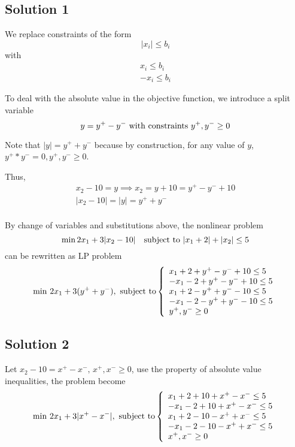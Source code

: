 \documentclass{article}
\begin{document}
\subsection{Solution 1}
We replace constraints of the form
\begin{equation} |x_i| \leq b_i \end{equation}
with
\begin{equation}
\begin{split}
	x_i \leq b_i \\
	-x_i \leq b_i
\end{split}
\end{equation}

To deal with the absolute value in the objective function, we introduce a split variable
\[ y = y^+ - y^- \textnormal{~with constraints~} y^+, y^- \geq 0 \]

Note that $|y| = y^+ + y^-$ because by construction, for any value of $y$, $y^+ * y^- = 0,   y^+, y^- \geq 0$.

Thus,
\begin{gather}
x_2 - 10 = y \implies x_2 = y + 10 = y^+ - y^- + 10 \\
|x_2 - 10| = |y| = y^+ + y^- \\
\end{gather}

By change of variables and substitutions above, the nonlinear problem
\[ \min 2 x_1 + 3|x_2 - 10| \quad \textnormal{subject to~} |x_1 + 2| + |x_2| \leq 5 \]
can be rewritten as LP problem
\begin{equation}
\min \, 2x_1+3(y^+ + y^-), \textnormal{ subject to}
\left\{
    \begin{array}{l}
    x_1 + 2 + y^+ - y^- + 10 \leq 5 \\
    -x_1 - 2 + y^+ - y^- + 10 \leq 5 \\
    x_1 + 2 - y^+ + y^- - 10 \leq 5 \\
    -x_1 - 2 - y^+ + y^- - 10 \leq 5 \\
     y^+, y^- \geq 0
    \end{array}
\right.
\end{equation}

\subsection{Solution 2}
Let $x_2-10=x^+-x^-,\, x^+,x^-\geq 0$, use the property of absolute value inequalities, the problem become
\begin{equation}  
\min \, 2x_1+3|x^+-x^-|, \textnormal{ subject to}
\left\{  
             \begin{array}{ll}
             x_1+2+10+x^+-x^-\leq 5\\
             -x_1-2+10+x^+-x^-\leq 5\\
             x_1+2-10-x^++x^-\leq 5\\
             -x_1-2-10-x^++x^-\leq 5\\
             x^+,x^-\geq 0
             \end{array}  
\right.  
\end{equation}  
\end{document}

